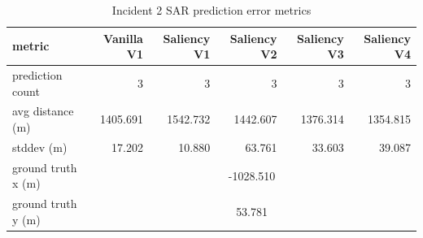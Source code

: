\begin{table}[ht]
\centering
\caption{Incident 2 SAR prediction error metrics}
\label{tab:sar-incident-2}
\begin{tabular}{lrrrrr}
\hline
metric & Vanilla V1 & Saliency V1 & Saliency V2 & Saliency V3 & Saliency V4 \\
\hline
prediction count & 3 & 3 & 3 & 3 & 3 \\
avg distance (m) & 1405.691 & 1542.732 & 1442.607 & 1376.314 & 1354.815 \\
stddev (m) & 17.202 & 10.880 & 63.761 & 33.603 & 39.087 \\
ground truth x (m) & \multicolumn{5}{c}{-1028.510} \\
ground truth y (m) & \multicolumn{5}{c}{53.781} \\
\hline
\end{tabular}
\end{table}
